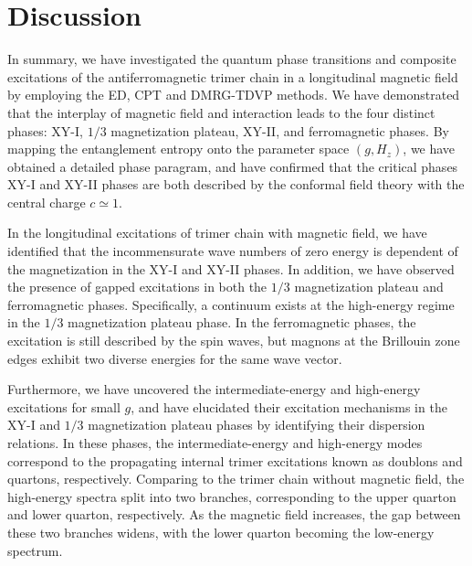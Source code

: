 \documentclass[aps,prx,showpacs,floatfix,twocolumn,superscriptaddress,nofootinbib,longbibliography]{revtex4-2}
\begin{document}
\section{Discussion}\label{discussion}
In summary, we have investigated the quantum phase transitions and composite excitations of the antiferromagnetic trimer chain in a  longitudinal magnetic field by employing the ED, CPT and DMRG-TDVP methods. 
 We have demonstrated that the interplay of magnetic field and interaction leads to the  four distinct phases: XY-I, $1/3$ magnetization plateau, XY-II, and ferromagnetic phases.  By mapping the   entanglement entropy onto the parameter space $(g,H_z)$, we have obtained a detailed phase paragram, and have confirmed that the critical phases XY-I and XY-II phases are both described by the conformal field theory with the central charge $c \simeq 1$. 

 In the longitudinal excitations of trimer chain with magnetic field, we have identified  that the incommensurate wave numbers of zero energy is dependent of the magnetization in the XY-I and XY-II phases.  In addition, we have observed the presence of gapped excitations in both the $1/3$ magnetization plateau and ferromagnetic phases. Specifically, a continuum exists at the high-energy regime in the $1/3$ magnetization plateau phase. In  the ferromagnetic phases, the excitation is still described  by the spin waves,  but magnons at the Brillouin zone edges exhibit two diverse energies for the same wave vector. 


 Furthermore, we have uncovered   the intermediate-energy and high-energy excitations for small $g$, and have elucidated their excitation mechanisms    in the XY-I and $1/3$ magnetization plateau  phases by identifying  their dispersion relations. 
 In these phases,  the intermediate-energy and high-energy modes correspond to the propagating internal trimer excitations known as doublons and quartons, respectively.
  Comparing to the trimer chain without magnetic field, the high-energy spectra split into two branches, corresponding  to the upper quarton and lower quarton, respectively. As the magnetic field increases,  the gap between these two branches widens, with the lower quarton becoming the low-energy spectrum.
\end{document}
